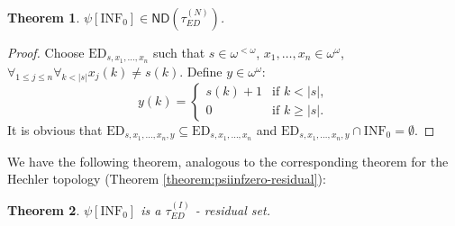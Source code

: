 \documentclass[12pt]{amsart}
\theoremstyle{plain}
\newtheorem{theorem}{Theorem}[section]
\theoremstyle{definition}
\theoremstyle{remark}
\newcommand{\baire}{\omega^{\omega}}
\newcommand{\finbaire}{\omega^{<\omega}}
\newcommand{\ND}{\mathsf{ND}}
\newcommand{\EventuallyDifferent}[2]{\mathrm{ED}_{#1,#2}}
\newcommand{\EventuallyDifferentNative}{\tau_{\mathit{ED}}^{(N)}}
\newcommand{\EventuallyDifferentInduced}{\tau_{\mathit{ED}}^{(I)}}
\newcommand{\INFZero}{\mathrm{INF}_0}
\begin{document}
\begin{theorem}
  $\psi[\INFZero] \in \ND(\EventuallyDifferentNative)$.
\end{theorem}
\begin{proof}
  Choose $\EventuallyDifferent{s}{x_1, \ldots, x_n}$ such that
  $s \in \finbaire$, $x_1,\ldots, x_n \in \baire$,
  $\forall_{1 \leq j \leq n} \forall_{k < |s|} x_j(k) \not= s(k)$.
  Define $y \in \baire$:
  \[
  y(k)= \begin{cases}
    s(k) + 1 & \text{if } k < |s|,\\
      0  & \text{if } k \geq |s|.
    \end{cases}
   \]
   It is obvious that
   $\EventuallyDifferent{s}{x_1, \ldots, x_n, y} \subseteq \EventuallyDifferent{s}{x_1, \ldots, x_n}$
   and
   $\EventuallyDifferent{s}{x_1, \ldots, x_n, y} \cap \INFZero = \emptyset$.
\end{proof}

We have the following theorem, analogous to the corresponding theorem
for the Hechler topology (Theorem \ref{theorem:psiinfzero-residual}):

\begin{theorem}\label{theorem:psiinfzero-residual-ED}
$\psi[\INFZero]$ is a $\EventuallyDifferentInduced$ - residual set.
\end{theorem}
\end{document}
